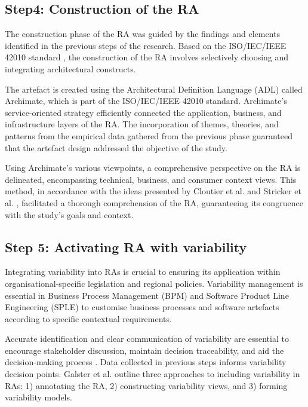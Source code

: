 \documentclass[review]{elsarticle}
\begin{document}
\subsection{Step4: Construction of the RA}

The construction phase of the RA was guided by the findings and elements identified in the previous steps of the research. Based on the ISO/IEC/IEEE 42010 standard \cite{ISO42010}, the construction of the RA involves selectively choosing and integrating architectural constructs.

The artefact is created using the Architectural Definition Language (ADL) called Archimate, which is part of the ISO/IEC/IEEE 42010 standard. Archimate's service-oriented strategy efficiently connected the application, business, and infrastructure layers of the RA. The incorporation of themes, theories, and patterns from the empirical data gathered from the previous phase guaranteed that the artefact design addressed the objective of the study.

Using Archimate's various viewpoints, a comprehensive perspective on the RA is delineated, encompassing technical, business, and consumer context views. This method, in accordance with the ideas presented by Cloutier et al. \cite{Cloutier2010} and Stricker et al. \cite{stricker2010creating}, facilitated a thorough comprehension of the RA, guaranteeing its congruence with the study's goals and context.

\subsection{Step 5: Activating RA with variability}

Integrating variability into RAs is crucial to ensuring its application within organisational-specific legislation and regional policies. Variability management is essential in Business Process Management (BPM) and Software Product Line Engineering (SPLE) to customise business processes and software artefacts according to specific contextual requirements.

Accurate identification and clear communication of variability are essential to encourage stakeholder discussion, maintain decision traceability, and aid the decision-making process \cite{czarnecki2012cool}. Data collected in previous steps informs variability decision points. Galster et al. \cite{GALSTER2011Empirically} outline three approaches to including variability in RAs: 1) annotating the RA, 2) constructing variability views, and 3) forming variability models.
\end{document}

